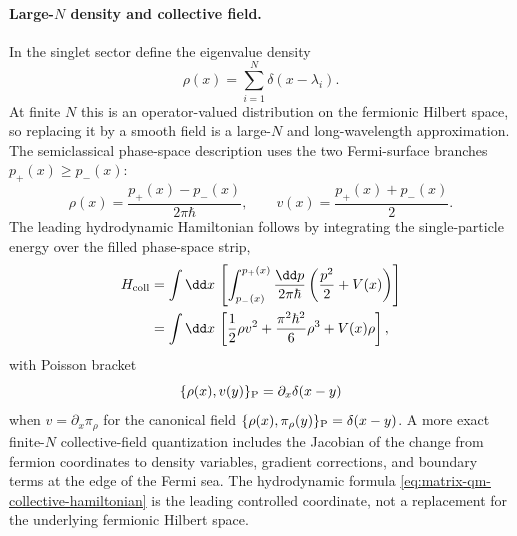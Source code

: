 \paragraph{Large-\(N\) density and collective field.}
In the singlet sector define the eigenvalue density
\begin{equation}
  \rho(x)=\sum_{i=1}^N\delta(x-\lambda_i).
  \label{eq:matrix-qm-density-definition}
\end{equation}
At finite \(N\) this is an operator-valued distribution on the fermionic
Hilbert space, so replacing it by a smooth field is a large-\(N\) and
long-wavelength approximation.  The semiclassical phase-space description
uses the two Fermi-surface branches \(p_+(x)\ge p_-(x)\):
\begin{equation}
  \rho(x)=\frac{p_+(x)-p_-(x)}{2\pi\hbar},
  \qquad
  v(x)=\frac{p_+(x)+p_-(x)}2 .
  \label{eq:matrix-qm-fermi-branches-density-velocity}
\end{equation}
The leading hydrodynamic Hamiltonian follows by integrating the
single-particle energy over the filled phase-space strip,
\begin{align}
  H_{\rm coll}
  &=
  \int \dd x\,
  \left[
    \int_{p_-(x)}^{p_+(x)}
    \frac{\dd p}{2\pi\hbar}
    \left(\frac{p^2}{2}+V(x)\right)
  \right]
  \notag\\
  &=
  \int\dd x\,
  \left[
    \frac12\rho v^2
    +\frac{\pi^2\hbar^2}{6}\rho^3
    +V(x)\rho
  \right],
  \label{eq:matrix-qm-collective-hamiltonian}
\end{align}
with Poisson bracket
\[
  \{\rho(x),v(y)\}_{\rm P}
  =
  \partial_x\delta(x-y)
\]
when \(v=\partial_x\pi_\rho\) for the canonical field
\(\{\rho(x),\pi_\rho(y)\}_{\rm P}=\delta(x-y)\).  A more exact finite-\(N\)
collective-field quantization includes the Jacobian of the change from
fermion coordinates to density variables, gradient corrections, and boundary
terms at the edge of the Fermi sea.  The hydrodynamic formula
\eqref{eq:matrix-qm-collective-hamiltonian} is the leading controlled
coordinate, not a replacement for the underlying fermionic Hilbert space.

